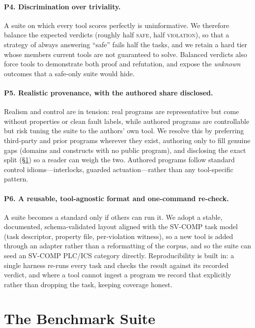 \paragraph{P4. Discrimination over triviality.}
A suite on which every tool scores perfectly is uninformative. We therefore balance the
expected verdicts (roughly half \textsc{safe}, half \textsc{violation}), so that a strategy
of always answering ``safe'' fails half the tasks, and we retain a hard tier whose members
current tools are not guaranteed to solve. Balanced verdicts also force tools to demonstrate
both proof and refutation, and expose the \emph{unknown} outcomes that a safe-only suite
would hide.

\paragraph{P5. Realistic provenance, with the authored share disclosed.}
Realism and control are in tension: real programs are representative but come without
properties or clean fault labels, while authored programs are controllable but risk tuning
the suite to the authors' own tool. We resolve this by preferring third-party and prior
programs wherever they exist, authoring only to fill genuine gaps (domains and constructs with
no public program), and disclosing the exact split (\S\ref{sec:suite}) so a reader can weigh
the two. Authored programs follow standard control idioms---interlocks, guarded actuation---rather
than any tool-specific pattern.

\paragraph{P6. A reusable, tool-agnostic format and one-command re-check.}
A suite becomes a standard only if others can run it. We adopt a stable, documented,
schema-validated layout aligned with the SV-COMP task model (task descriptor, property file,
per-violation witness), so a new tool is added through an adapter rather than a reformatting
of the corpus, and so the suite can seed an SV-COMP PLC/ICS category directly. Reproducibility
is built in: a single harness re-runs every task and checks the result against its recorded
verdict, and where a tool cannot ingest a program we record that explicitly rather than
dropping the task, keeping coverage honest.


\section{The Benchmark Suite}
\label{sec:suite}

